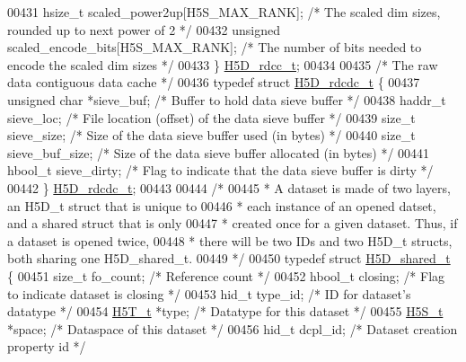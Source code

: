 \begin{DoxyCode}
00431     hsize\_t             scaled\_power2up[H5S\_MAX\_RANK];      \textcolor{comment}{/* The scaled dim sizes, rounded up to next
       power of 2 */}
00432     \textcolor{keywordtype}{unsigned}            scaled\_encode\_bits[H5S\_MAX\_RANK];   \textcolor{comment}{/* The number of bits needed to encode the
       scaled dim sizes */}
00433 \} \hyperlink{struct_h5_d__rdcc__t}{H5D\_rdcc\_t};
00434 
00435 \textcolor{comment}{/* The raw data contiguous data cache */}
00436 \textcolor{keyword}{typedef} \textcolor{keyword}{struct }\hyperlink{struct_h5_d__rdcdc__t}{H5D\_rdcdc\_t} \{
00437     \textcolor{keywordtype}{unsigned} \textcolor{keywordtype}{char} *sieve\_buf;   \textcolor{comment}{/* Buffer to hold data sieve buffer */}
00438     haddr\_t sieve\_loc;          \textcolor{comment}{/* File location (offset) of the data sieve buffer */}
00439     \textcolor{keywordtype}{size\_t} sieve\_size;          \textcolor{comment}{/* Size of the data sieve buffer used (in bytes) */}
00440     \textcolor{keywordtype}{size\_t} sieve\_buf\_size;      \textcolor{comment}{/* Size of the data sieve buffer allocated (in bytes) */}
00441     hbool\_t sieve\_dirty;        \textcolor{comment}{/* Flag to indicate that the data sieve buffer is dirty */}
00442 \} \hyperlink{struct_h5_d__rdcdc__t}{H5D\_rdcdc\_t};
00443 
00444 \textcolor{comment}{/*}
00445 \textcolor{comment}{ * A dataset is made of two layers, an H5D\_t struct that is unique to}
00446 \textcolor{comment}{ * each instance of an opened datset, and a shared struct that is only}
00447 \textcolor{comment}{ * created once for a given dataset.  Thus, if a dataset is opened twice,}
00448 \textcolor{comment}{ * there will be two IDs and two H5D\_t structs, both sharing one H5D\_shared\_t.}
00449 \textcolor{comment}{ */}
00450 \textcolor{keyword}{typedef} \textcolor{keyword}{struct }\hyperlink{struct_h5_d__shared__t}{H5D\_shared\_t} \{
00451     \textcolor{keywordtype}{size\_t}              fo\_count;       \textcolor{comment}{/* Reference count */}
00452     hbool\_t             closing;        \textcolor{comment}{/* Flag to indicate dataset is closing */}
00453     hid\_t               type\_id;        \textcolor{comment}{/* ID for dataset's datatype    */}
00454     \hyperlink{struct_h5_t__t}{H5T\_t}              *type;           \textcolor{comment}{/* Datatype for this dataset     */}
00455     \hyperlink{struct_h5_s__t}{H5S\_t}              *space;          \textcolor{comment}{/* Dataspace of this dataset    */}
00456     hid\_t               dcpl\_id;        \textcolor{comment}{/* Dataset creation property id */}

\end{DoxyCode}
